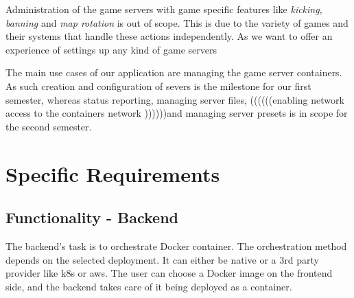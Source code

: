\documentclass[a4paper,12pt,chapterprefix=false,bibliography=totoc,listof=totoc,]{scrreprt}
\begin{document}
Administration of the game servers with game specific features like \emph{kicking}, \emph{banning} and \emph{map rotation} is out of scope. This is due to the variety of games and their systems that handle these actions independently. As we want to offer an experience of settings up any kind of game servers

The main use cases of our application are managing the game server containers.
As such creation and configuration of severs is the milestone for our first semester, whereas status reporting, managing server files, ((((((enabling network access to the containers network ))))))and managing server presets is in scope for the second semester.

\chapter{Specific Requirements}

\section{Functionality - Backend}


The backend's task is to orchestrate Docker container. The orchestration method depends on the selected deployment. It can either be native or a 3rd party provider like \gls{k8s} or \gls{aws}. The user can choose a Docker image on the frontend side, and the backend takes care of it being deployed as a container.
\end{document}
